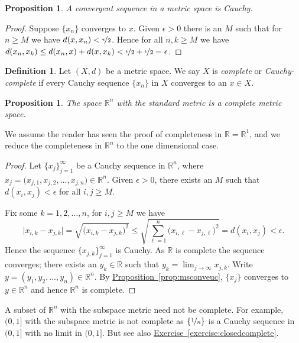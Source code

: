 \documentclass[12pt,openany]{book}
\newcommand{\R}{{\mathbb{R}}}
\newcommand{\myindex}[1]{#1\index{#1}}
\theoremstyle{plain}
\newtheorem{prop}[thm]{Proposition}
\theoremstyle{remark}
\theoremstyle{definition}
\newtheorem{defn}[thm]{Definition}
\theoremstyle{exercise}
\theoremstyle{example}
\newcommand{\exerciseref}[1]{\hyperref[#1]{Exercise~\ref*{#1}}}
\newcommand{\propref}[1]{\hyperref[#1]{Proposition~\ref*{#1}}}
\begin{document}
\begin{prop}
A convergent sequence in a metric space is Cauchy.
\end{prop}

\begin{proof}
Suppose $\{ x_n \}$ converges to $x$.
Given $\epsilon > 0$ there is an $M$ such that for $n \geq M$
we have $d(x,x_n) < \nicefrac{\epsilon}{2}$.  Hence
for all $n,k \geq M$ we have
$d(x_n,x_k) \leq d(x_n,x) + d(x,x_k) < \nicefrac{\epsilon}{2} +
\nicefrac{\epsilon}{2} = \epsilon$.
\end{proof}

\begin{defn}
Let $(X,d)$ be a metric space.  We say $X$ is
\emph{\myindex{complete}} or \emph{\myindex{Cauchy-complete}}
if every Cauchy sequence $\{ x_n \}$ in $X$
converges to an $x \in X$.
\end{defn}

\begin{prop}
The space $\R^n$ with the standard metric is a complete metric space.
\end{prop}

We assume the reader has seen the proof of completeness in $\R = \R^1$,
and we reduce the completeness in $\R^n$ to the one dimensional case.

\begin{proof}
Let $\{ x_j \}_{j=1}^\infty$ be a Cauchy sequence
in $\R^n$, where $x_j = \bigl(x_{j,1},x_{j,2},\ldots,x_{j,n}\bigr) \in \R^n$.
Given $\epsilon > 0$, there exists an $M$ such that
$d(x_i,x_j) < \epsilon$
for all
$i,j \geq M$.

Fix some $k=1,2,\ldots,n$, for $i,j \geq M$ we have
\begin{equation*}
\bigl\lvert x_{i,k} - x_{j,k} \bigr\rvert
=
\sqrt{{\bigl(x_{i,k} - x_{j,k}\bigr)}^2}
\leq
\sqrt{\sum_{\ell=1}^n {\bigl(x_{i,\ell}-x_{j,\ell}\bigr)}^2}
= d(x_i,x_j) < \epsilon .
\end{equation*}
Hence the sequence $\{ x_{j,k} \}_{j=1}^\infty$ is Cauchy.  As $\R$ is
complete the sequence converges; there exists an $y_k \in \R$ such that
$y_k = \lim_{j\to\infty} x_{j,k}$.
Write $y = (y_1,y_2,\ldots,y_n) \in \R^n$.
By \propref{prop:msconveuc}, $\{ x_j \}$ converges
to $y \in \R^n$ and hence $\R^n$ is complete.
\end{proof}

A subset of $\R^n$ with the subspace metric need not be
complete.  For example, $(0,1]$ with the subspace metric is not
complete as $\{ \nicefrac{1}{n} \}$ is a Cauchy sequence in $(0,1]$
with no limit in $(0,1]$.  But see also
\exerciseref{exercise:closedcomplete}.
\end{document}
